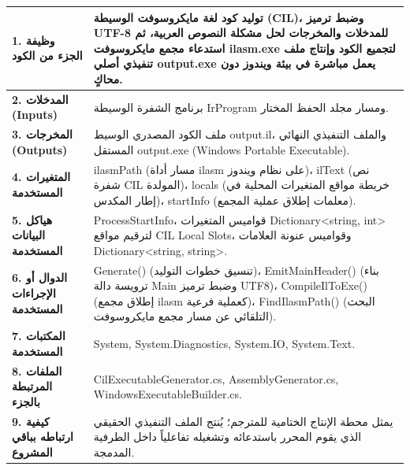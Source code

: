 \documentclass[12pt,a4paper]{report}
\begin{document}
\begin{tcolorbox}[colback=white,colframe=vscodeBlue!80!black,arc=2mm,title=\textbf{بطاقة المواصفات البرمجية لتوليد الملف التنفيذي (PE Executable Generator Specification)}]
\begin{tabularx}{\linewidth}{p{4.2cm} X}
    \textbf{1. وظيفة الجزء من الكود} & توليد كود لغة مايكروسوفت الوسيطة (CIL)، وضبط ترميز UTF-8 للمدخلات والمخرجات لحل مشكلة النصوص العربية، ثم استدعاء مجمع مايكروسوفت \textenglish{ilasm.exe} لتجميع الكود وإنتاج ملف تنفيذي أصلي \textenglish{output.exe} يعمل مباشرة في بيئة ويندوز دون محاكٍ. \\
    \midrule
    \textbf{2. المدخلات (Inputs)} & برنامج الشفرة الوسيطة \textenglish{IrProgram} ومسار مجلد الحفظ المختار. \\
    \midrule
    \textbf{3. المخرجات (Outputs)} & ملف الكود المصدري الوسيط \textenglish{output.il}، والملف التنفيذي النهائي المستقل \textenglish{output.exe} (Windows Portable Executable). \\
    \midrule
    \textbf{4. المتغيرات المستخدمة} & \textenglish{ilasmPath} (مسار أداة ilasm على نظام ويندوز)، \textenglish{ilText} (نص شفرة CIL المولدة)، \textenglish{locals} (خريطة مواقع المتغيرات المحلية في إطار المكدس)، \textenglish{startInfo} (معلمات إطلاق عملية المجمع). \\
    \midrule
    \textbf{5. هياكل البيانات المستخدمة} & \textenglish{ProcessStartInfo}، قواميس المتغيرات \textenglish{Dictionary\textless string, int\textgreater} لترقيم مواقع CIL Local Slots، وقواميس عنونة العلامات \textenglish{Dictionary\textless string, string\textgreater}. \\
    \midrule
    \textbf{6. الدوال أو الإجراءات المستخدمة} & \textenglish{Generate()} (تنسيق خطوات التوليد)، \textenglish{EmitMainHeader()} (بناء ترويسة دالة Main وضبط ترميز UTF8)، \textenglish{CompileIlToExe()} (إطلاق مجمع ilasm كعملية فرعية)، \textenglish{FindIlasmPath()} (البحث التلقائي عن مسار مجمع مايكروسوفت). \\
    \midrule
    \textbf{7. المكتبات المستخدمة} & \textenglish{System, System.Diagnostics, System.IO, System.Text}. \\
    \midrule
    \textbf{8. الملفات المرتبطة بالجزء} & \textenglish{CilExecutableGenerator.cs, AssemblyGenerator.cs, WindowsExecutableBuilder.cs}. \\
    \midrule
    \textbf{9. كيفية ارتباطه بباقي المشروع} & يمثل محطة الإنتاج الختامية للمترجم؛ يُنتج الملف التنفيذي الحقيقي الذي يقوم المحرر باستدعائه وتشغيله تفاعلياً داخل الطرفية المدمجة. \\
\end{tabularx}
\end{tcolorbox}
\end{document}
